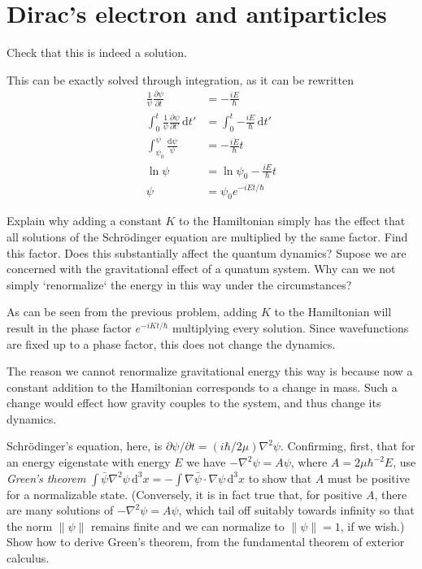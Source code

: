 \documentclass[../road-to-reality.tex]{subfiles}
\begin{document}
	\printanswers
	
	\section{Dirac's electron and antiparticles}
	
	\begin{questions}
		\question Check that this is indeed a solution.
		
		\begin{solution}
			This can be exactly solved through integration, as it can be rewritten
			\begin{align*}
				\frac{1}{\psi}\frac{\partial\psi}{\partial t} &= {-\frac{iE}{\hbar}} \\
				\int_0^t\frac{1}{\psi}\frac{\partial\psi}{\partial t'}\,\mathrm{d}t' &= \int_0^t{-\frac{iE}{\hbar}}\,\mathrm{d}t' \\
				\int_{\psi_0}^{\psi}\frac{\mathrm{d}\psi}{\psi} &= {-\frac{iE}{\hbar}}t \\
				\ln\psi &= \ln\psi_0 - \frac{iE}{\hbar}t \\
				\psi &= \psi_0e^{-iEt/\hbar}
			\end{align*}
		\end{solution}
		
		\question Explain why adding a constant $K$ to the Hamiltonian simply has the effect that all solutions of the Schr\"odinger equation are multiplied by the same factor. Find this factor. Does this substantially affect the quantum dynamics? Supose we are concerned with the gravitational effect of a qunatum system. Why can we not simply `renormalize` the energy in this way under the circumstances?
	
		\begin{solution}
			As can be seen from the previous problem, adding $K$ to the Hamiltonian will result in the phase factor $e^{-iKt/\hbar}$ multiplying every solution. Since wavefunctions are fixed up to a phase factor, this does not change the dynamics.
			
			The reason we cannot renormalize gravitational energy this way is because now a constant addition to the Hamiltonian corresponds to a change in mass. Such a change would effect how gravity couples to the system, and thus change its dynamics.
		\end{solution}
	
	\question Schr\"odinger's equation, here, is $\partial\psi/\partial t = (i\hbar/2\mu)\nabla^2\psi$. Confirming, first, that for an energy eigenstate with energy $E$ we have $-\nabla^2\psi = A\psi$, where $A = 2\mu\hbar^{-2}E$, use \textit{Green's theorem} $\int\bar{\psi}\nabla^2\psi\,\mathrm{d}^3x=-\int\nabla\bar{\psi}\cdot\nabla\psi\,\mathrm{d}^3x$ to show that $A$ must be positive for a normalizable state. (Conversely, it is in fact true that, for positive $A$, there are many solutions of $-\nabla^2\psi=A\psi$, which tail off suitably towards infinity so that the norm $\|\psi\|$ remains finite and we can normalize to $\|\psi\|=1$, if we wish.) Show how to derive Green's theorem, from the fundamental theorem of exterior calculus.
	

\end{questions}
\end{document}
